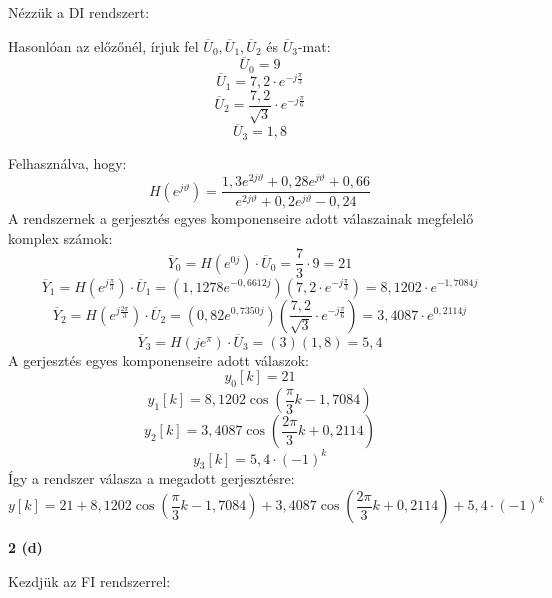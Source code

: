 \documentclass[12pt,a4paper]{article}
\begin{document}
Nézzük a DI rendszert:

Hasonlóan az előzőnél, írjuk fel $\overline{U}_0, \overline{U}_1, \overline{U}_2$ és $\overline{U}_3$-mat:
\[\overline{U}_0 = 9\]
\[\overline{U}_1 = 7,2\cdot e^{-j\frac{\pi}{3}}\]
\[\overline{U}_2 = \frac{7,2}{\sqrt{3}}\cdot e^{-j\frac{\pi}{6}}\]
\[\overline{U}_3 = 1,8\]

Felhasználva, hogy:
\[H(e^{j \vartheta}) = \frac{1,3e^{2j\vartheta}+0,28e^{j\vartheta}+0,66}{e^{2j\vartheta}+ 0,2e^{j\vartheta}-0,24} \]
A rendszernek a gerjesztés egyes komponenseire adott válaszainak megfelelő komplex számok:
\[\overline{Y}_0 = H(e^{0j})\cdot\overline{U}_0 = \frac{7}{3}\cdot 9 = 21\]
\[\overline{Y}_1 = H(e^{j\frac{\pi}{3}})\cdot\overline{U}_1 = (1,1278e^{-0,6612j})(7,2\cdot e^{-j\frac{\pi}{3}}) = 8,1202\cdot e^{-1,7084j}\]
\[\overline{Y}_2 = H(e^{j\frac{2\pi}{3}})\cdot\overline{U}_2 = (0,82e^{0,7350j})\left(\frac{7,2}{\sqrt{3}}\cdot e^{-j\frac{\pi}{6}}\right)= 3,4087\cdot e^{0,2114j} \]
\[\overline{Y}_3 = H(je^{\pi})\cdot\overline{U}_3 = (3)(1,8)= 5,4\]
A gerjesztés egyes komponenseire adott válaszok:
\[y_0[k] = 21\]
\[y_1[k] = 8,1202\cos\left(\frac{\pi}{3}k-1,7084\right)\]
\[y_2[k] = 3,4087\cos\left(\frac{2\pi}{3}k+0,2114\right)\]
\[y_3[k] = 5,4\cdot(-1)^k\]
Így a rendszer válasza a megadott gerjesztésre:
\[\boxed{y[k] = 21 + 8,1202\cos\left(\frac{\pi}{3}k-1,7084\right) + 3,4087\cos\left(\frac{2\pi}{3}k+0,2114\right) + 5,4\cdot(-1)^k}\]

\textbf{2 (d)}

Kezdjük az FI rendszerrel:
\end{document}
